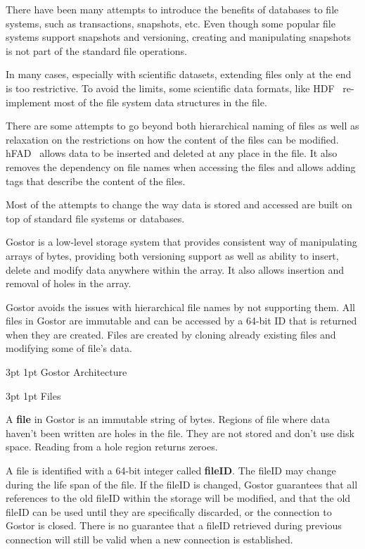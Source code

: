 \documentclass[11pt]{p9article}
\makeatletter
\renewcommand\section{\@startsection {section}{1}{\z@} {3pt} {1pt} {\normalfont\normalsize\bfseries}}
\renewcommand\subsection{\@startsection {subsection}{1}{\z@} {3pt} {1pt} {\normalfont\normalsize\bfseries}}
\makeatother
\begin{document}
There have been many attempts to introduce the benefits of databases to
file systems, such as transactions, snapshots, etc. Even though
some popular file systems support snapshots and versioning,
creating and manipulating snapshots is not part of the standard file
operations.

In many cases, especially with scientific datasets, extending files
only at the end is too restrictive. To avoid the limits, some
scientific data formats, like HDF~\cite{hdf} re-implement most of the
file system data structures in the file.

There are some attempts to go beyond both hierarchical naming of files
as well as relaxation on the restrictions on how the content of the
files can be modified.
hFAD~\cite{Seltzer:2009:HFS:1855568.1855569} allows data to be
inserted and deleted at any place in the file. It also removes the
dependency on file names when accessing the files and allows adding
tags that describe the content of the files. 

Most of the attempts to change the way data is stored and accessed are
built on top of standard file systems or databases.

Gostor is a low-level storage system that provides consistent way of
manipulating arrays of bytes, providing both versioning support as
well as ability to insert, delete and modify data anywhere within the
array. It also allows insertion and removal of holes in the array.

Gostor avoids the issues with hierarchical file names by not
supporting them. All files in Gostor are immutable and can be accessed
by a 64-bit ID that is returned when they are created. Files are
created by cloning already existing files and modifying some of file's
data.

\section{Gostor Architecture}


\subsection{Files}

A {\bfseries file} in Gostor is an immutable string of bytes. Regions
of file where data haven't been written are holes in the file. They
are not stored and don't use disk space. Reading from a hole region
returns zeroes.

A file is identified with a 64-bit integer called {\bfseries fileID}.
The fileID may change during the life span of the file. If the
fileID is changed, Gostor guarantees that all references to the old
fileID within the storage will be modified, and that the old fileID
can be used until they are specifically discarded, or the connection
to Gostor is closed. There is no guarantee that a fileID retrieved
during previous connection will still be valid when a new connection
is established.
\end{document}
